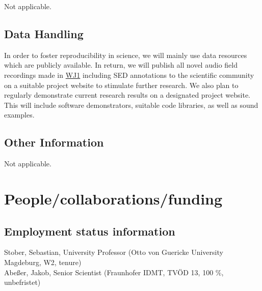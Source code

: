 \documentclass[11pt]{article}
\newcommand{\wpref}[2]{\hyperlink{sec:W#1}{#2}}
\begin{document}
Not applicable.
\vspace{-.3cm}


\subsection{Data Handling}

In order to foster reproducibility in science, we will mainly use data resources which are publicly available.
In return, we will publish all novel audio field recordings made in \wpref{J1}{WJ1} including SED annotations to the scientific community on a suitable project website to stimulate further research.
We also plan to regularly demonstrate current research results on a designated project website. This will include software demonstrators, suitable code libraries, as well as sound examples.



\subsection{Other Information}
Not applicable.
\vspace{-.3cm}
\section{People/collaborations/funding}

\subsection{Employment status information}

Stober, Sebastian, University Professor (Otto von Guericke University Magdeburg, W2, tenure) \\
Abeßer, Jakob, Senior Scientist (Fraunhofer IDMT, TVÖD 13, 100 \%, unbefristet)
\end{document}
